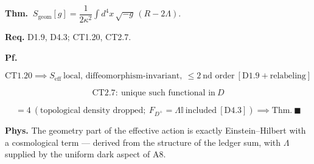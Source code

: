 \begin{theorem}\label{tag:CT1-21}
\textbf{Thm.} $\ S_{\mathrm{geom}}[g]=\dfrac{1}{2\kappa^2}\displaystyle\int d^4x\,\sqrt{-g}\,(R-2\Lambda).$

\textbf{Req.} D1.9, D4.3; CT1.20, CT2.7.

\textbf{Pf.}

\[
\mathrm{CT1.20}\implies S_{\mathrm{eff}}\ \text{local, diffeomorphism-invariant},\ \le2\ \text{nd order}\ [\mathrm{D1.9}+\text{relabeling}]
\]

\[
\mathrm{CT2.7}:\ \text{unique such functional in}\ D
\]

\[
= 4\ (\text{topological density dropped};\ F_{D^+}=\Lambda\mathbb I\ \text{included}\ [\mathrm{D4.3}])\implies\text{Thm}.\ \blacksquare
\]

\textbf{Phys.} The geometry part of the effective action is exactly Einstein–Hilbert with a cosmological term — derived from the structure of the ledger sum, with $\Lambda$ supplied by the uniform dark aspect of A8.

\end{theorem}

